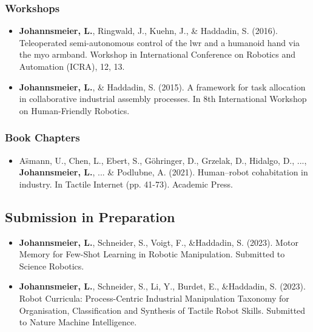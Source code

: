 \subsubsection*{Workshops}
\begin{itemize}
    \item \textbf{Johannsmeier, L.}, Ringwald, J., Kuehn, J., \& Haddadin, S. (2016). Teleoperated semi-autonomous control of the lwr and a humanoid hand via the myo armband. Workshop in International Conference on Robotics and Automation (ICRA), 12, 13.
    \item \textbf{Johannsmeier, L.}, \& Haddadin, S. (2015). A framework for task allocation in collaborative industrial assembly processes. In 8th International Workshop on Human-Friendly Robotics.
\end{itemize}

\subsubsection*{Book Chapters}
\begin{itemize}
    \item A\"smann, U., Chen, L., Ebert, S., G\"ohringer, D., Grzelak, D., Hidalgo, D., ..., \textbf{Johannsmeier, L.}, ... \& Podlubne, A. (2021). Human–robot cohabitation in industry. In Tactile Internet (pp. 41-73). Academic Press.
\end{itemize}

\subsection*{Submission in Preparation}

\begin{itemize}
    \item \textbf{Johannsmeier, L.}, Schneider, S., Voigt, F., \&Haddadin, S. (2023). Motor Memory for Few-Shot Learning in Robotic Manipulation. Submitted to Science Robotics.
    \item \textbf{Johannsmeier, L.}, Schneider, S., Li, Y., Burdet, E., \&Haddadin, S. (2023). Robot Curricula: Process-Centric Industrial Manipulation Taxonomy for Organisation, Classification and Synthesis of Tactile Robot Skills. Submitted to Nature Machine Intelligence.
\end{itemize}